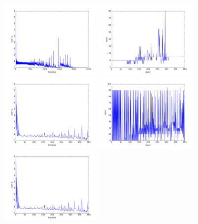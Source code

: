 \begin{figure}[htb]
\centering
\includegraphics[width=0.45\textwidth]{images/redes/ejecucion1/general_svm_casia/cost.png}
\includegraphics[width=0.45\textwidth]{images/redes/ejecucion1/general_svm_casia/error.png}
\includegraphics[width=0.45\textwidth]{images/redes/ejecucion1/general_svm_casia/minidataset/cost.png}
\includegraphics[width=0.45\textwidth]{images/redes/ejecucion1/general_svm_casia/minidataset/error.png}
\includegraphics[width=0.45\textwidth]{images/redes/ejecucion1/general_svm_casia/minidataset_tested_itself/cost.png}

\end{figure}
